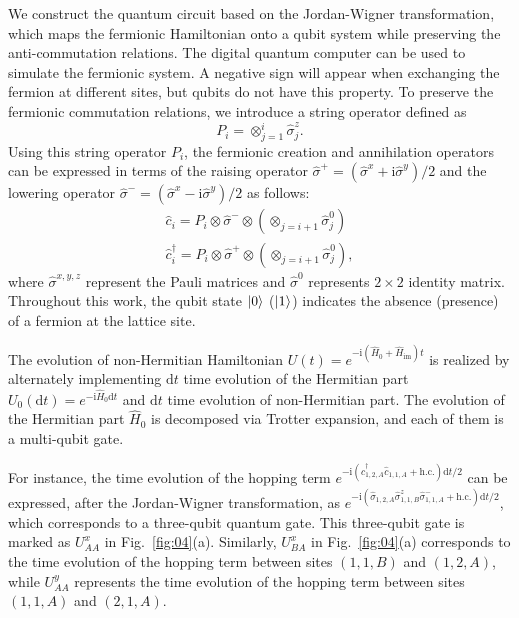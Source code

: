 \documentclass[longbibliography, aps, prx, amsmath, amssymb, amsfonts, twocolumn,superscriptaddress, footinbib]{revtex4-1}
\begin{document}
	{We construct the quantum circuit based on the Jordan-Wigner transformation, which maps the fermionic Hamiltonian onto a qubit system while preserving the anti-commutation relations.} {The digital quantum computer can be used to simulate the fermionic system. A negative sign will appear when exchanging the fermion at different sites, but qubits do not have this property. To preserve the fermionic commutation relations, we introduce a string operator defined as}
	\begin{equation}
		{P_i = \otimes_{j=1}^i\hat{\sigma}^z_j.}
	\end{equation}
	{Using this string operator $P_i$, the fermionic creation and annihilation operators can be expressed in terms of the raising operator $\hat{\sigma}^+=(\hat{\sigma}^x+\mathrm{i}\hat{\sigma}^y)/2$ and the lowering operator $\hat{\sigma}^-=(\hat{\sigma}^x-\mathrm{i}\hat{\sigma}^y)/2$ as follows:}
	\begin{equation}
		{
		\begin{split}
			\hat{c}_i = P_i \otimes \hat{\sigma}^{-}\otimes (\otimes_{j=i+1}\hat{\sigma}^0_j)\\
			\hat{c}_i^{\dagger} = P_i \otimes \hat{\sigma}^{+}\otimes (\otimes_{j=i+1}\hat{\sigma}^0_j),
		\end{split}}
	\end{equation}
	{where $\hat{\sigma}^{x,y,z}$ represent the Pauli matrices and $\hat{\sigma}^0$ represents $2\times 2$ identity matrix. Throughout this work, the qubit state $\ket{0}$ ($\ket{1}$) indicates the absence (presence) of a fermion at the lattice site.}
	
	{The evolution of non-Hermitian Hamiltonian $U(t) = e^{-\mathrm{i}(\hat{H}_0 + \hat{H}_{\text{im}})t}$ is realized by alternately implementing $\mathrm{d} t$ time evolution of the Hermitian part $U_0(\mathrm{d}t)=e^{-\mathrm{i}\hat{H}_0 \mathrm{d}t}$ and $\mathrm{d} t$ time evolution of non-Hermitian part. The evolution of the Hermitian part $\hat{H}_0$ is decomposed via Trotter expansion, and each of them is a multi-qubit gate.}
	
	{For instance, the time evolution of the hopping term $e^{-\mathrm{i}  (\hat{c}_{1,2,A}^{\dagger} \hat{c}_{1,1,A} +\text{h.c.})\mathrm{d} t/2}$ can be expressed, after the Jordan-Wigner transformation, as $e^{-\mathrm{i} (\hat{\sigma}_{1,2,A} \hat{\sigma}^z_{1,1,B}\hat{\sigma}_{1,1,A}^{-} +\text{h.c.})\mathrm{d} t /2}$, which corresponds to a three-qubit quantum gate. This three-qubit gate is marked as $U_{AA}^x$ in Fig.~\ref{fig:04}(a). Similarly, $U_{BA}^x$ in Fig.~\ref{fig:04}(a) corresponds to the time evolution of the hopping term between sites $(1,1,B)$ and $(1,2,A)$, while $U_{AA}^y$ represents the time evolution of the hopping term between sites $(1,1,A)$ and $(2,1,A)$.}
	
\end{document}
